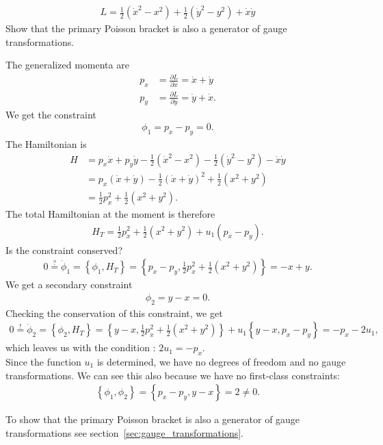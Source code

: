 \begin{exercise}
\begin{align*}
L = \frac{1}{2} (\dot{x}^2 - x^2) + \frac{1}{2} (\dot{y}^2 - y^2) + \dot{x}\dot{y}
\end{align*}
Show that the primary Poisson bracket is also a generator of gauge transformations. 
\end{exercise}
\begin{solution}
The generalized momenta are
\begin{align*}
p_x &= \frac{\partial L}{\partial \dot{x}} = \dot{x} + \dot{y} \\
p_y &= \frac{\partial L}{\partial \dot{y}} = \dot{y} + \dot{x}.
\end{align*}
We get the constraint 
\begin{align*}
\phi_1 = p_x - p_y = 0.
\end{align*}
The Hamiltonian is
\begin{align*}
H &= p_x \dot{x} + p_y \dot{y} - \frac{1}{2} (\dot{x}^2 - x^2) - \frac{1}{2} (\dot{y}^2 - y^2) - \dot{x}\dot{y} \\
&= p_x (\dot{x} + \dot{y}) - \frac{1}{2} (\dot{x} + \dot{y})^2 + \frac{1}{2} (x^2 + y^2) \\
&= \frac{1}{2} p_x^2 + \frac{1}{2} (x^2 + y^2).
\end{align*}
The total Hamiltonian at the moment is therefore
\begin{align*}
H_T = \frac{1}{2} p_x^2 + \frac{1}{2} (x^2 + y^2) + u_1 (p_x - p_y).
\end{align*}
Is the constraint conserved?
\begin{align*}
0 \overset{?}{=} \dot{\phi}_1 = \left \{ \phi_1,H_T \right \} = \left \{ p_x - p_y,\frac{1}{2} p_x^2 + \frac{1}{2} (x^2 + y^2) \right \} = -x + y.
\end{align*}
We get a secondary constraint
\begin{align*}
\phi_2 = y - x = 0.
\end{align*}
Checking the conservation of this constraint, we get
\begin{align*}
0 \overset{!}{=} \dot{\phi}_2 = \left \{ \phi_2,H_T \right \} = \left \{ y - x,\frac{1}{2} p_x^2 + \frac{1}{2} (x^2 + y^2) \right \} + u_1  \left \{ y - x,p_x - p_y \right \} = - p_x - 2 u_1,
\end{align*}
which leaves us with the condition : $2 u_1 = - p_x$. \\
Since the function $u_1$ is determined, we have no degrees of freedom and no gauge transformations. We can see this also because we have no first-class constraints:
\begin{align*}
\left \{ \phi_1,\phi_2 \right \} = \left \{ p_x - p_y,y - x \right \} = 2 \neq 0.
\end{align*} 

To show that the primary Poisson bracket is also a generator of gauge transformations see section~\vref{sec:gauge_transformations}.
\end{solution}




